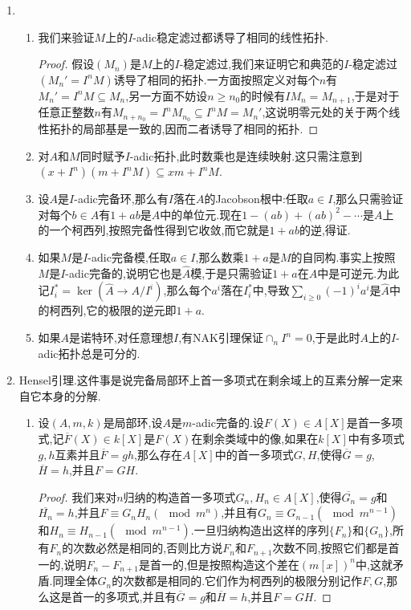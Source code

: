 \begin{enumerate}
	\item 
	\begin{enumerate}[(1)]
		\item 我们来验证$M$上的$I$-adic稳定滤过都诱导了相同的线性拓扑.
		\begin{proof}
			
			假设$(M_n)$是$M$上的$I$-稳定滤过,我们来证明它和典范的$I$-稳定滤过$(M_n'=I^nM)$诱导了相同的拓扑.一方面按照定义对每个$n$有$M_n'=I^nM\subseteq M_n$,另一方面不妨设$n\ge n_0$的时候有$IM_n=M_{n+1}$,于是对于任意正整数$n$有$M_{n+n_0}=I^nM_{n_0}\subseteq I^nM=M_n'$,这说明零元处的关于两个线性拓扑的局部基是一致的,因而二者诱导了相同的拓扑.
		\end{proof}
		\item 对$A$和$M$同时赋予$I$-adic拓扑,此时数乘也是连续映射.这只需注意到$(x+I^n)(m+I^nM)\subseteq xm+I^nM$.
		\item 设$A$是$I$-adic完备环,那么有$I$落在$A$的Jacobson根中:任取$a\in I$,那么只需验证对每个$b\in A$有$1+ab$是$A$中的单位元.现在$1-(ab)+(ab)^2-\cdots$是$A$上的一个柯西列,按照完备性得到它收敛,而它就是$1+ab$的逆,得证.
		\item 如果$M$是$I$-adic完备模,任取$a\in I$,那么数乘$1+a$是$M$的自同构.事实上按照$M$是$I$-adic完备的,说明它也是$\widehat{A}$模,于是只需验证$1+a$在$\widehat{A}$中是可逆元.为此记$I_i^*=\ker(\widehat{A}\to A/I^i)$,那么每个$a^i$落在$I_i^*$中,导致$\sum_{i\ge0}(-1)^ia^i$是$\widehat{A}$中的柯西列,它的极限的逆元即$1+a$.
		\item 如果$A$是诺特环,对任意理想$I$,有NAK引理保证$\cap_nI^n=0$,于是此时$A$上的$I$-adic拓扑总是可分的.
	\end{enumerate}
	\item Hensel引理.这件事是说完备局部环上首一多项式在剩余域上的互素分解一定来自它本身的分解.
	\begin{enumerate}[(1)]
		\item 设$(A,m,k)$是局部环,设$A$是$m$-adic完备的.设$F(X)\in A[X]$是首一多项式,记$\overline{F}(X)\in k[X]$是$F(X)$在剩余类域中的像,如果在$k[X]$中有多项式$g,h$互素并且$\overline{F}=gh$,那么存在$A[X]$中的首一多项式$G,H$,使得$\overline{G}=g$,$\overline{H}=h$,并且$F=GH$.
		\begin{proof}
			
			我们来对$n$归纳的构造首一多项式$G_n,H_n\in A[X]$,使得$\overline{G_n}=g$和$\overline{H_n}=h$,并且$F\equiv G_nH_n(\mod m^n)$,并且有$G_n\equiv G_{n-1}(\mod m^{n-1})$和$H_n\equiv H_{n-1}(\mod m^{n-1})$.一旦归纳构造出这样的序列$\{F_n\}$和$\{G_n\}$,所有$F_n$的次数必然是相同的,否则比方说$F_n$和$F_{n+1}$次数不同,按照它们都是首一的,说明$F_n-F_{n+1}$是首一的,但是按照构造这个差在$(m[x])^n$中,这就矛盾.同理全体$G_n$的次数都是相同的.它们作为柯西列的极限分别记作$F,G$,那么这是首一的多项式,并且有$\overline{G}=g$和$\overline{H}=h$,并且$F=GH$.
			

\end{proof}
\end{enumerate}
\end{enumerate}
